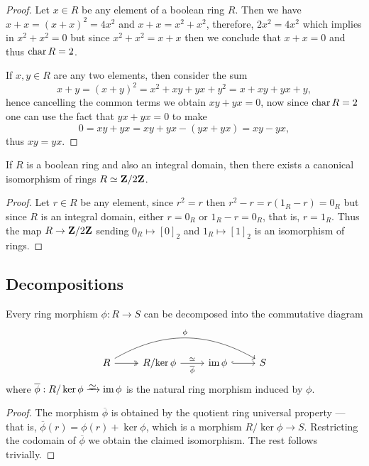 \begin{proof}
Let \(x \in R\) be any element of a boolean ring \(R\). Then we have
\(x + x = (x + x)^2 = 4 x^2\) and \(x + x = x^2 + x^2\), therefore,
\(2 x^2 = 4 x^2\) which implies in \(x^2 + x^2 = 0\) but since
\(x^2 + x^2 = x + x\) then we conclude that \(x + x = 0\) and thus
\(\operatorname{char} R = 2\).

If \(x, y \in R\) are any two elements, then consider the sum
\[
x + y
= (x + y)^2
= x^2 + x y + y x + y^2
= x + x y + y x + y,
\]
hence cancelling the common terms we obtain \(x y + y x = 0\), now since
\(\operatorname{char} R = 2\) one can use the fact that \(y x + yx = 0\) to make
\[
0 = x y + y x = x y + y x - (y x + y x) = x y - y x,
\]
thus \(x y = y x\).
\end{proof}

\begin{corollary}
\label{cor:boolean-integral-domain-is-Z/2Z}
If \(R\) is a boolean ring and also an integral domain, then there exists a
canonical isomorphism of rings \(R \simeq \mathbf{Z}/2\mathbf{Z}\).
\end{corollary}

\begin{proof}
Let \(r \in R\) be any element, since \(r^2 = r\) then
\(r^2 - r = r(1_R - r) = 0_R\) but since \(R\) is an integral domain, either
\(r = 0_R\) or \(1_R - r = 0_R\), that is, \(r = 1_R\). Thus the map
\(R \to \mathbf{Z}/2\mathbf{Z}\) sending \(0_R \mapsto [0]_2\) and \(1_R \mapsto [1]_2\) is an
isomorphism of rings.
\end{proof}

\subsection{Decompositions}

\begin{theorem}
\label{thm:ring-first-isomorphism}
Every ring morphism \(\phi: R \to S\) can be decomposed into the commutative
diagram
\[
\begin{tikzcd}
R \ar[r, two heads] \ar[rrr, bend left, "\phi"]
&R/{\ker \phi} \ar[r, "\dis", "\overline{\phi}"']
&\im \phi \ar[r, hook]
&S
\end{tikzcd}
\]
where \(\overline{\phi}: R/\ker \phi \isoto \im \phi\) is the natural ring
morphism induced by \(\phi\).
\end{theorem}

\begin{proof}
The morphism \(\overline{\phi}\) is obtained by the quotient ring universal
property --- that is, \(\overline{\phi}(r) = \phi(r) + \ker \phi\), which is a
morphism \(R/{\ker \phi} \to S\). Restricting the codomain of
\(\overline{\phi}\) we obtain the claimed isomorphism. The rest follows
trivially.
\end{proof}

